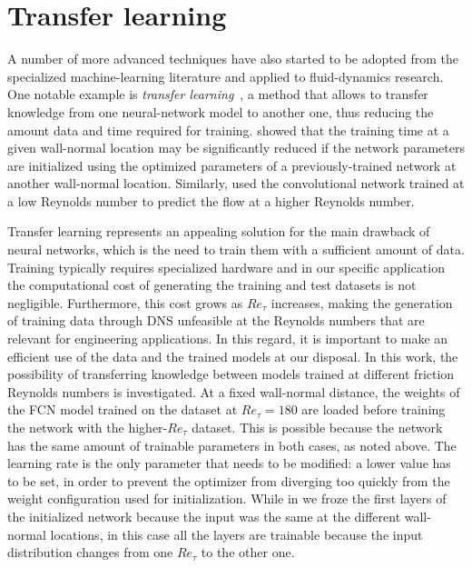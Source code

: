 \section{Transfer learning}\label{ss:tl}

A number of more advanced techniques have also started to be adopted from the specialized machine-learning literature and applied to fluid-dynamics research.
One notable example is \textit{transfer learning}~\citep{pan2009survey}, a method that allows to transfer knowledge from one neural-network model to another one, thus reducing the amount data and time required for training.
\citet{guastoni2020prediction} showed that the training time at a given wall-normal location may be significantly reduced if the network parameters are initialized using the optimized parameters of a previously-trained network at another wall-normal location.
Similarly, \citet{kim2020prediction} used the convolutional network trained at a low Reynolds number to predict the flow at a higher Reynolds number.

Transfer learning represents an appealing solution for the main drawback of neural networks, which is the need to train them with a sufficient amount of data.
Training typically requires specialized hardware and in our specific application the computational cost of generating the training and test datasets is not negligible.
Furthermore, this cost grows as $Re_{\tau}$ increases, making the generation of training data through DNS unfeasible at the Reynolds numbers that are relevant for engineering applications.
In this regard, it is important to make an efficient use of the data and the trained models at our disposal.
In this work, the possibility of transferring knowledge between models trained at different friction Reynolds numbers is investigated.
At a fixed wall-normal distance, the weights of the FCN model trained on the dataset at $Re_{\tau} = 180$ are loaded before training the network with the higher-$Re_{\tau}$ dataset.
This is possible because the network has the same amount of trainable parameters in both cases, as noted above.
The learning rate is the only parameter that needs to be modified: a lower value has to be set, in order to prevent the optimizer from diverging too quickly from the weight configuration used for initialization.
While in \citet{guastoni2020prediction} we froze the first layers of the initialized network because the input was the same at the different wall-normal locations, in this case all the layers are trainable because the input distribution changes from one $Re_{\tau}$ to the other one.

